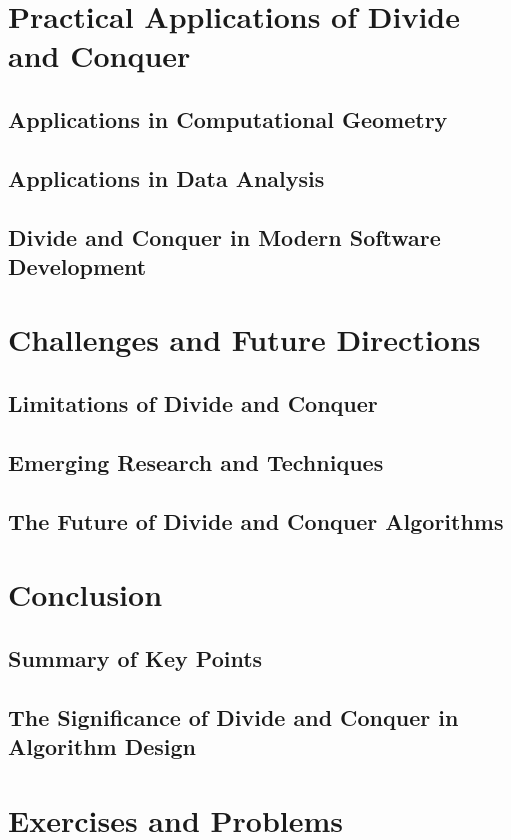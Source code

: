 \documentclass[12pt]{book} %
\begin{document}
\section{Practical Applications of Divide and Conquer}
\subsection{Applications in Computational Geometry}
\subsection{Applications in Data Analysis}
\subsection{Divide and Conquer in Modern Software Development}

\section{Challenges and Future Directions}
\subsection{Limitations of Divide and Conquer}
\subsection{Emerging Research and Techniques}
\subsection{The Future of Divide and Conquer Algorithms}

\section{Conclusion}
\subsection{Summary of Key Points}
\subsection{The Significance of Divide and Conquer in Algorithm Design}

\section{Exercises and Problems}
\end{document}
